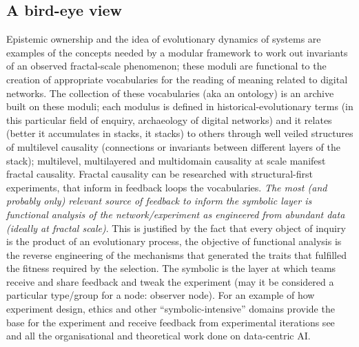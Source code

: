 \documentclass[14pt,a4paper]{extarticle}
\begin{document}
\subsection*{A bird-eye view}
\label{subsec:bird-eye}

\hspace*{15mm}Epistemic ownership and the idea of evolutionary dynamics of systems are examples of the concepts needed by a modular framework to work out invariants of an observed fractal-scale phenomenon; these moduli are functional to the creation of appropriate vocabularies for the reading of meaning related to digital networks. The collection of these vocabularies (aka an ontology) is an archive built on these moduli; each modulus is defined in historical-evolutionary terms (in this particular field of enquiry, archaeology of digital networks) and it relates (better it accumulates in stacks, it stacks) to others through well veiled structures of multilevel causality \cite{ScholarMultilevel} (connections or invariants between different layers of the stack); multilevel, multilayered and multidomain causality at scale manifest fractal causality. Fractal causality can be researched with structural-first experiments, that inform in feedback loops the vocabularies. \textit{The most (and probably only) relevant source of feedback to inform the symbolic layer is functional analysis of the network/experiment as engineered from abundant data (ideally at fractal scale)}. This is justified by the fact that every object of inquiry is the product of an evolutionary process, the objective of functional analysis is the reverse engineering of the mechanisms that generated the traits that fulfilled the fitness required by the selection. The symbolic is the layer at which teams receive and share feedback and tweak the experiment (may it be considered a particular type/group for a node: observer node). For an example of how experiment design, ethics and other “symbolic-intensive” domains provide the base for the experiment and receive feedback from experimental iterations see \cite{Andrewng} and all the organisational and theoretical work done on data-centric AI.
\newline
\end{document}

